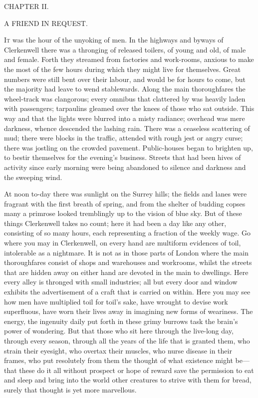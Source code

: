 {}

{CHAPTER II.}

A FRIEND IN REQUEST.

\textsc{It} was the hour of the unyoking of men. In the highways and
byways of Clerkenwell there was a thronging of released toilers, of
young and old, of male and female. Forth they streamed from factories
and work-rooms, anxious to make the most of the few hours during which
they might live for themselves. Great numbers were still bent over their
labour, and would be for hours to come, but the majority had leave to
wend stablewards. Along the main thoroughfares the wheel-track was
clangorous; every omnibus that clattered by was heavily laden with
passengers; tarpaulins gleamed over the knees of those who sat outside.
This way and that the lights were blurred into a misty radiance;
overhead was mere {}darkness, whence descended the lashing rain. There
was a ceaseless scattering of mud; there were blocks in the traffic,
attended with rough jest or angry curse; there was jostling on the
crowded pavement. Public-houses began to brighten up, to bestir
themselves for the evening's business. Streets that had been hives of
activity since early morning were being abandoned to silence and
darkness and the sweeping wind.

At noon to-day there was sunlight on the Surrey hills; the fields and
lanes were fragrant with the first breath of spring, and from the
shelter of budding copses many a primrose looked tremblingly up to the
vision of blue sky. But of these things Clerkenwell takes no count; here
it had been a day like any other, consisting of so many hours, each
representing a fraction of the weekly wage. Go where you may in
Clerkenwell, on every hand are multiform evidences of toil, intolerable
as a nightmare. It is not as in those parts of London where the main
thoroughfares consist of shops and warehouses and {}workrooms, whilst
the streets that are hidden away on either hand are devoted in the main
to dwellings. Here every alley is thronged with small industries; all
but every door and window exhibits the advertisement of a craft that is
carried on within. Here you may see how men have multiplied toil for
toil's sake, have wrought to devise work superfluous, have worn their
lives away in imagining new forms of weariness. The energy, the
ingenuity daily put forth in these grimy burrows task the brain's power
of wondering. But that those who sit here through the live-long day,
through every season, through all the years of the life that is granted
them, who strain their eyesight, who overtax their muscles, who nurse
disease in their frames, who put resolutely from them the thought of
what existence might be---that these do it all without prospect or hope
of reward save the permission to eat and sleep and bring into the world
other creatures to strive with them for bread, surely that thought is
yet more marvellous.

